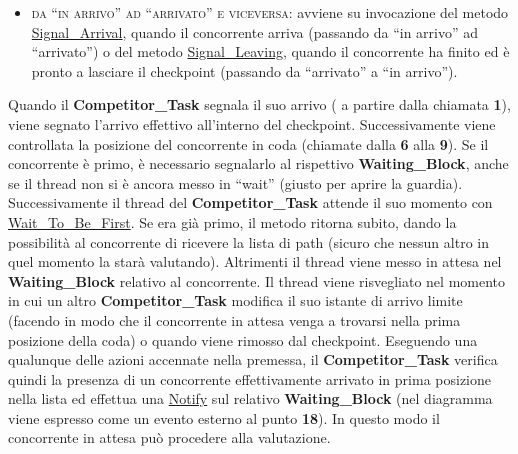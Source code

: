 \begin{description}
\begin{itemize}
\item \textsc{da ``in arrivo'' ad ``arrivato'' e viceversa}: avviene su invocazione del metodo \underline{Signal\_Arrival}, quando il concorrente
arriva (passando da ``in arrivo'' ad ``arrivato'') o del metodo \underline{Signal\_Leaving}, quando il concorrente ha finito ed \`{e} pronto
a lasciare il checkpoint (passando da ``arrivato'' a ``in arrivo'').
\end{itemize}
Quando il \textbf{Competitor\_Task} segnala il suo arrivo ( a partire dalla chiamata \textbf{1}), viene segnato l'arrivo effettivo all'interno del checkpoint. Successivamente
viene controllata la posizione del concorrente in coda (chiamate dalla \textbf{6} alla \textbf{9}). Se il concorrente \`{e} primo, \`{e} necessario segnalarlo al rispettivo 
\textbf{Waiting\_Block}, anche se il thread non si \`{e} ancora messo in ``wait'' (giusto per aprire la guardia). Successivamente il thread del \textbf{Competitor\_Task} attende
il suo momento con \underline{Wait\_To\_Be\_First}. Se era gi\`{a} primo, il metodo ritorna subito, dando la possibilit\`{a} al concorrente di ricevere la lista di path (sicuro che nessun
altro in quel momento la star\`{a} valutando). Altrimenti il thread viene messo in attesa nel \textbf{Waiting\_Block} relativo al concorrente. Il thread viene risvegliato
nel momento in cui un altro \textbf{Competitor\_Task} modifica il suo istante di arrivo limite (facendo in modo che il concorrente in attesa venga a trovarsi nella prima
posizione della coda) o quando viene rimosso dal checkpoint. Eseguendo una qualunque delle azioni accennate nella premessa, il \textbf{Competitor\_Task} verifica quindi
la presenza di un concorrente effettivamente arrivato in prima posizione nella lista ed effettua una \underline{Notify} sul relativo \textbf{Waiting\_Block} (nel diagramma
viene espresso come un evento esterno al punto \textbf{18}). In questo modo il concorrente in attesa pu\`{o} procedere alla valutazione.
\end{description}
\newpage

